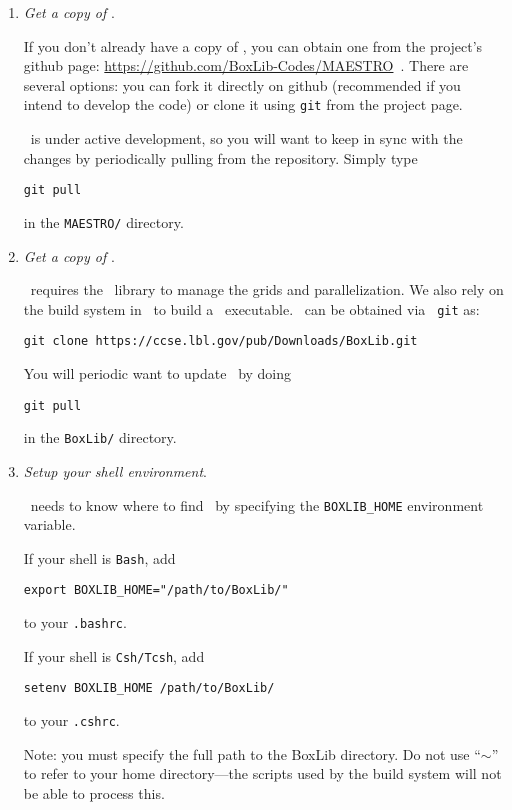 \begin{enumerate}

\item {\em Get a copy of \maestro}.

If you don't already have a copy of \maestro, you can obtain one from
the project's {\sf github}
page: \url{https://github.com/BoxLib-Codes/MAESTRO}\, .  There are
several options: you can fork it directly on {\sf github} (recommended
if you intend to develop the code) or clone it using {\tt git} from
the project page.

\maestro\ is under active development, so you will want to keep in 
sync with the changes by periodically pulling from the repository.  Simply
type
\begin{verbatim}
git pull
\end{verbatim}
in the {\tt MAESTRO/} directory.

\item {\em Get a copy of \boxlib}.

\maestro\ requires the \boxlib\ library to manage the grids and 
parallelization.  We also rely on the build system in \boxlib\ to
build a \maestro\ executable.  \boxlib\ can be obtained via {\tt
git} as:
\begin{verbatim}
git clone https://ccse.lbl.gov/pub/Downloads/BoxLib.git
\end{verbatim}

You will periodic want to update \boxlib\ by doing
\begin{verbatim}
git pull
\end{verbatim}
in the {\tt BoxLib/} directory.


\item {\em Setup your shell environment}.

\maestro\ needs to know where to find \boxlib\, by specifying the 
{\tt BOXLIB\_HOME} environment variable.  

If your shell is {\tt Bash}, add
\begin{verbatim}
export BOXLIB_HOME="/path/to/BoxLib/"
\end{verbatim}
to your {\tt .bashrc}. 

If your shell is {\tt Csh/Tcsh}, add
\begin{verbatim}
setenv BOXLIB_HOME /path/to/BoxLib/
\end{verbatim}
to your {\tt .cshrc}.  

Note: you must specify the full path to the BoxLib directory.  Do not
use ``$\sim$'' to refer to your home directory---the scripts used by
the build system will not be able to process this.


\end{enumerate}
